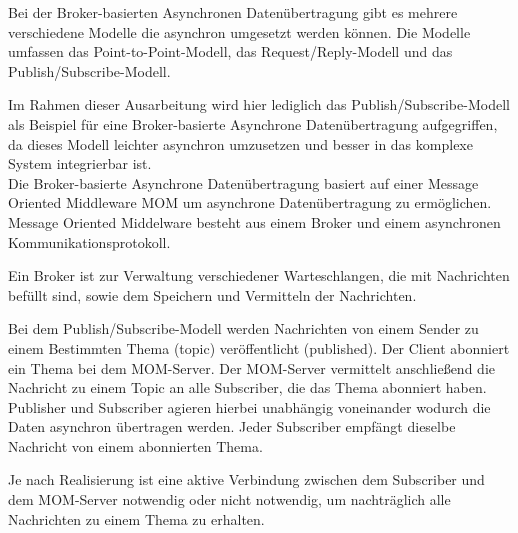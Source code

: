Bei der Broker-basierten Asynchronen Datenübertragung gibt es mehrere verschiedene Modelle die asynchron umgesetzt werden können. Die Modelle umfassen das Point-to-Point-Modell, das Request/Reply-Modell und das Publish/Subscribe-Modell. \cite*{abts:2019,tremp:2021}

Im Rahmen dieser Ausarbeitung wird hier lediglich das Publish/Subscribe-Modell als Beispiel für eine Broker-basierte Asynchrone Datenübertragung aufgegriffen, da dieses Modell leichter asynchron umzusetzen und besser in das komplexe System integrierbar ist. \\

Die Broker-basierte Asynchrone Datenübertragung basiert auf einer Message Oriented Middleware \ac{MOM} um asynchrone Datenübertragung zu ermöglichen. Message Oriented Middelware besteht aus einem Broker und einem asynchronen Kommunikationsprotokoll. \cite*{tremp:2021}

Ein Broker ist zur Verwaltung verschiedener Warteschlangen, die mit Nachrichten befüllt sind, sowie dem Speichern und Vermitteln der Nachrichten. \cite*{tremp:2021}

Bei dem Publish/Subscribe-Modell werden Nachrichten von einem Sender zu einem Bestimmten Thema (topic) veröffentlicht (published). Der Client abonniert ein Thema bei dem MOM-Server. Der MOM-Server vermittelt anschließend die Nachricht zu einem Topic an alle Subscriber, die das Thema abonniert haben. \cite*{abts:2019} Publisher und Subscriber agieren hierbei unabhängig voneinander wodurch die Daten asynchron übertragen werden. Jeder Subscriber empfängt dieselbe Nachricht von einem abonnierten Thema. \cite*{tremp:2021}

Je nach Realisierung ist eine aktive Verbindung zwischen dem Subscriber und dem MOM-Server notwendig oder nicht notwendig, um nachträglich alle Nachrichten zu einem Thema zu erhalten. \cite*{abts:2019}